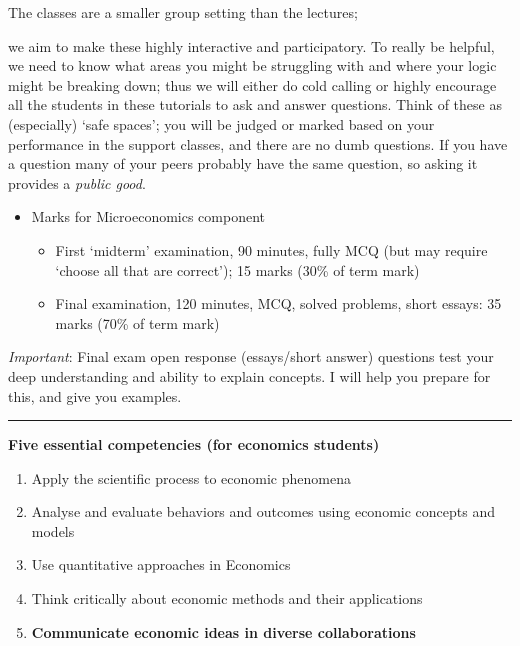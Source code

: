 \documentclass[]{article}
\providecommand{\tightlist}{%
  \setlength{\itemsep}{0pt}\setlength{\parskip}{0pt}}
\begin{document}
The classes are a smaller group setting than the lectures;

we aim to make these highly interactive and participatory. To really be helpful, we need to know what areas you might be struggling with and where your logic might be breaking down; thus we will either do cold calling or highly encourage all the students in these tutorials to ask and answer questions. Think of these as (especially) `safe spaces'; you will be judged or marked based on your performance in the support classes, and there are no dumb questions. If you have a question many of your peers probably have the same question, so asking it provides a \emph{public good}.

\begin{itemize}
\tightlist
\item
  Marks for Microeconomics component

  \begin{itemize}
  \tightlist
  \item
    First `midterm' examination, 90 minutes, fully MCQ (but may require `choose all that are correct'); 15 marks (30\% of term mark)
  \item
    Final examination, 120 minutes, MCQ, solved problems, short essays: 35 marks (70\% of term mark)
  \end{itemize}
\end{itemize}

\emph{Important}: Final exam open response (essays/short answer) questions test your deep understanding and ability to explain concepts. I will help you prepare for this, and give you examples.

\begin{center}\rule{0.5\linewidth}{\linethickness}\end{center}

\textbf{Five essential competencies (for economics students)}

\begin{enumerate}
\def\labelenumi{\arabic{enumi}.}
\item
  Apply the scientific process to economic phenomena
\item
  Analyse and evaluate behaviors and outcomes using economic concepts and models
\item
  Use quantitative approaches in Economics
\item
  Think critically about economic methods and their applications
\item
  \textbf{Communicate economic ideas in diverse collaborations}
\end{enumerate}
\end{document}
